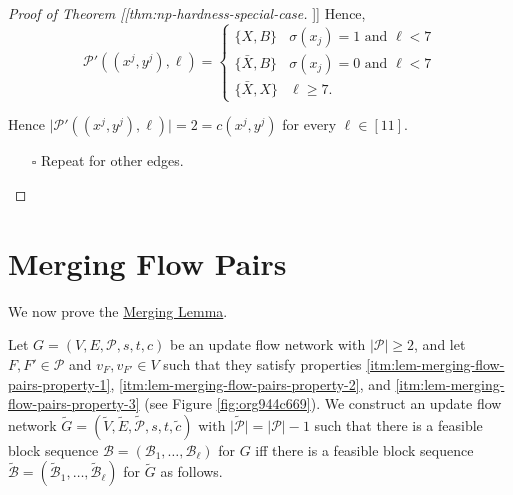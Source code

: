 \documentclass[fontsize=11pt,paper=a4]{book}
\begin{document}
\begin{proof}[Proof of Theorem [[thm:np-hardness-special-case]]]
Hence,
\[\mathcal{P}'((x^j,y^j),\ell)=
\begin{cases}
\{X,B\} & \sigma(x_j)=1\text{ and }\ell<7\\
\{\bar{X},B\} & \sigma(x_j)=0\text{ and }\ell<7\\
\{\bar{X},X\} & \ell\geq 7.
\end{cases}\]

Hence \(\lvert\mathcal{P}'((x^j,y^j),\ell)\rvert=2=c(x^j,y^j)\) for every \(\ell\in[11]\).

\begin{itemize}
\item[{$\square$}] Repeat for other edges.
\end{itemize}
\end{proof}

\chapter{Merging Flow Pairs}
\label{sec:orgc1fe47e}

We now prove the \hyperref[orgce7cb77]{Merging Lemma}.

Let \(G=(V,E,\mathcal{P},s,t,c)\) be an update flow network with \(\lvert\mathcal{P}\rvert\geq 2\), and let \(F,F'\in\mathcal{P}\) and \(v_F,v_{F'}\in V\) such that they satisfy properties \ref{itm:lem-merging-flow-pairs-property-1}, \ref{itm:lem-merging-flow-pairs-property-2}, and \ref{itm:lem-merging-flow-pairs-property-3} (see Figure \ref{fig:org944c669}).
We construct an update flow network \(\tilde{G}=(\tilde{V},\tilde{E},\tilde{\mathcal{P}},s,t,\tilde{c})\) with \(\lvert\tilde{\mathcal{P}}\rvert=\lvert\mathcal{P}\rvert-1\) such that there is a feasible block sequence \(\mathcal{B}=(\mathscr{B}_1,\dots,\mathscr{B}_{\ell})\) for \(G\) iff there is a feasible block sequence \(\tilde{\mathcal{B}}=(\tilde{\mathscr{B}}_1,\dots,\tilde{\mathscr{B}}_{\ell})\) for \(\tilde{G}\) as follows.
\end{document}
